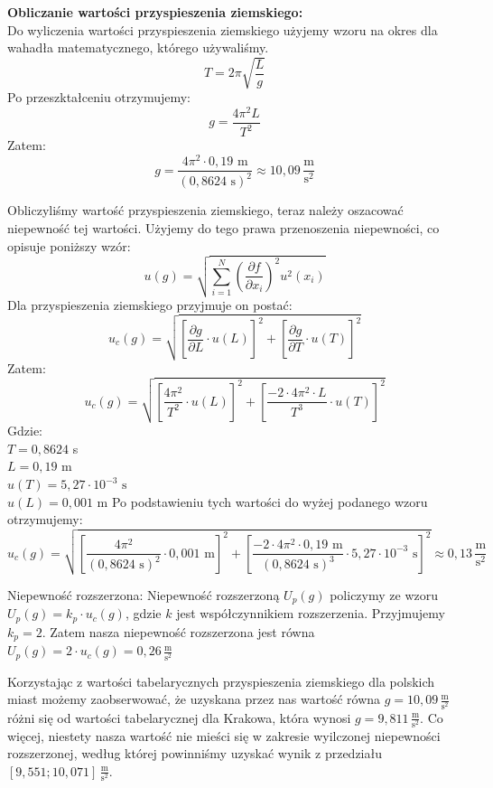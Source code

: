 \documentclass[a4paper,11pt]{article}
\begin{document}
\vspace{2cm}

\noindent \textbf{Obliczanie wartości przyspieszenia ziemskiego:}\\
Do wyliczenia wartości przyspieszenia ziemskiego użyjemy wzoru na okres dla wahadła matematycznego, którego używaliśmy.
$$T = 2\pi\sqrt{\frac{L}{g}} $$
Po przeszktałceniu otrzymujemy:
$$g = \frac{4\pi^2L}{T^2} $$
Zatem:
$$g = \frac{4\pi^2\cdot 0{,}19 \textrm{ m}}{(0{,}8624 \textrm{ s})^2} \approx 10{,}09\,\frac{\textrm{m}}{\textrm{s}^2}$$

Obliczyliśmy wartość przyspieszenia ziemskiego, teraz należy oszacować niepewność tej wartości. Użyjemy do tego prawa przenoszenia niepewności, co opisuje poniższy wzór:
$$u(g) = \sqrt{\displaystyle \sum_{i=1} ^N \left( \frac{\partial f}{\partial x_i}\right)^2 u^2(x_i)}$$
Dla przyspieszenia ziemskiego przyjmuje on postać:
$$u_c(g) = \sqrt{\left[ \frac{\partial g}{\partial L} \cdot u(L) \right]^2 +\left[ \frac{\partial g}{\partial T} \cdot u(T) \right]^2} $$
Zatem:
$$u_c(g) = \sqrt{\left[ \frac{4\pi^2}{T^2} \cdot u(L) \right]^2 +\left[ \frac{-2\cdot 4\pi^2\cdot L}{T^3} \cdot u(T) \right]^2} $$
\noindent Gdzie: \\
$T = 0{,}8624 $ s\\
$L = 0{,}19 $ m\\
$u(T) = 5{,}27\cdot 10^{-3}\textrm{ s} $ \\
$u(L) = 0{,}001$ m
Po podstawieniu tych wartości do wyżej podanego wzoru otrzymujemy:
$$u_c(g) = \sqrt{\left[ \frac{4\pi^2}{(0{,}8624 \textrm{ s})^2} \cdot 0{,}001 \textrm{ m} \right]^2 +\left[ \frac{-2\cdot 4\pi^2\cdot 0{,}19 \textrm{ m}}{(0{,}8624 \textrm{ s})^3} \cdot  5{,}27\cdot 10^{-3}\textrm{ s} \right]^2} \approx 0{,}13\,\frac{\textrm{m}}{\textrm{s}^2}$$

\noindent Niepewność rozszerzona:
Niepewność rozszerzoną $U_p(g)$ policzymy ze wzoru $U_p(g) = k_p\cdot u_c(g)$, gdzie $k$ jest współczynnikiem rozszerzenia. Przyjmujemy $k_p = 2$. Zatem nasza niepewność rozszerzona jest równa $U_p(g) = 2\cdot u_c(g) = 0{,}26\,\frac{\textrm{m}}{\textrm{s}^2}$

Korzystając z wartości tabelarycznych przyspieszenia ziemskiego dla polskich miast możemy zaobserwować, że uzyskana przez nas wartość równa $g=10{,}09\,\frac{\textrm{m}}{\textrm{s}^2}$ różni się od wartości tabelarycznej dla Krakowa, która wynosi $g=9{,}811\,\frac{\textrm{m}}{\textrm{s}^2}$. Co więcej, niestety nasza wartość nie mieści się w zakresie wyilczonej niepewności rozszerzonej, według której powinniśmy uzyskać wynik z przedziału $\left[9{,}551;10{,}071\right]\, \frac{\textrm{m}}{\textrm{s}^2}$.
\newpage
\end{document}
